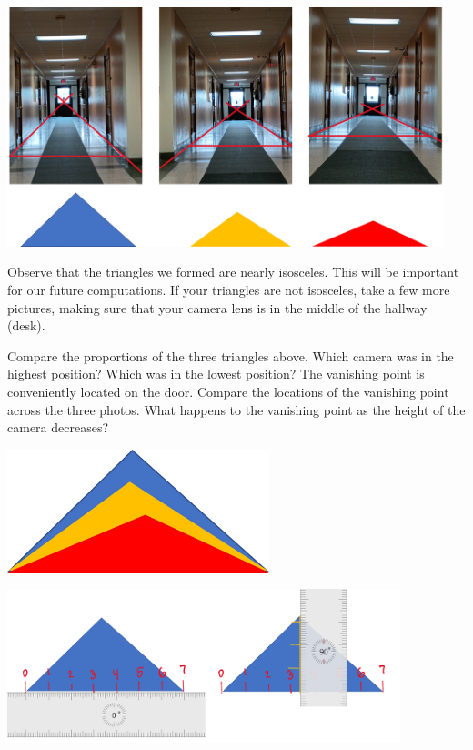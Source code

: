\documentclass{ximera}
\begin{document}
\begin{exploration}
\begin{image}
         \includegraphics[width=5in]{hallsAndTriangles.jpg}
\end{image}

Observe that the triangles we formed are nearly isosceles.  This will be important for our future computations.  If your triangles are not isosceles, take a few more pictures, making sure that your camera lens is in the middle of the hallway (desk).

\begin{question}
    Compare the proportions of the three triangles above. Which camera was in the highest position?  Which was in the lowest position?  The vanishing point is conveniently located on the door.  Compare the locations of the vanishing point across the three photos.  What happens to the vanishing point as the height of the camera decreases?

    \begin{multipleChoice}
    \end{multipleChoice}
\end{question}


\begin{image}
         \includegraphics[width=3in]{threeTriangles.jpg}
\end{image}

\begin{image}
         \includegraphics[width=4.5in]{triangleMeasures.jpg}
\end{image}



\end{exploration}
\end{document}
